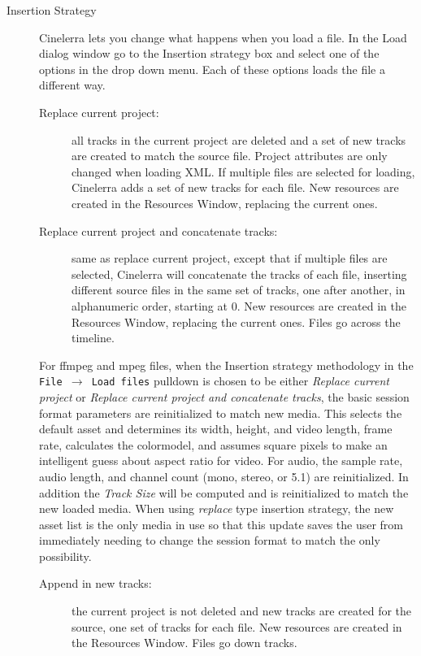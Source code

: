 \begin{description}
    \item[Insertion Strategy] 
    Cinelerra lets you change what happens when you load a file.  In the Load dialog window go to the Insertion strategy box and select one of the options in the drop down menu. Each of these options loads the file a different way.
    
    \begin{description}
       \item [Replace current project:] all tracks in the current project are deleted and a set of new tracks are created to match the source file.  Project attributes are only changed when loading XML. If multiple files are selected for loading, Cinelerra adds a set of new tracks for each file. New resources are created in the Resources Window, replacing the current ones.
       \item [Replace current project and concatenate tracks: ] same as replace current project, except that if multiple files are selected, Cinelerra will concatenate the tracks of each file, inserting different source files in the same set of tracks, one after another, in alphanumeric order, starting at 0. New resources are created in the Resources Window, replacing the current ones.  Files go across the timeline.
    \end{description}
    For ffmpeg and mpeg files, when the Insertion strategy methodology in the \texttt{File $\rightarrow$ Load files} pulldown is chosen to be either \textit{Replace current project} or \textit{Replace current project and concatenate tracks}, the basic session format parameters are reinitialized to match new media.  This selects the default asset and determines its width, height, and video length, frame rate, calculates the colormodel, and assumes square pixels to make an intelligent guess about aspect ratio for video.  For audio, the sample rate, audio length, and channel count (mono, stereo, or 5.1) are reinitialized.  In addition the \textit{Track Size} will be computed and is reinitialized to match the new loaded media.  When using \textit{replace} type insertion strategy, the new asset list is the only media in use so that this update saves the user from immediately needing to change the session format to match the only possibility.
    \begin{description}
        \item[Append in new tracks:] the current project is not deleted and new tracks are created for the source, one set of tracks for each file. New resources are created in the Resources Window.  Files go down tracks.

\end{description}
\end{description}
